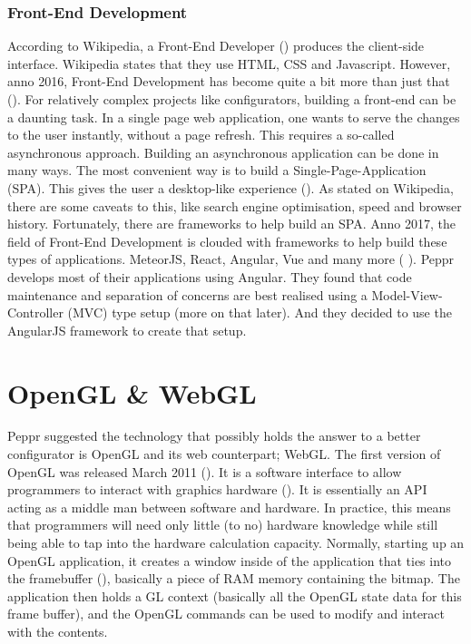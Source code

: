 \subsubsection{Front-End Development}
According to Wikipedia, a Front-End Developer (\cite{frontEndDevDefinition}) produces the client-side interface. Wikipedia states that they use HTML, CSS and Javascript. However, anno 2016, Front-End Development has become quite a bit more than just that (\cite{javascriptAnno2016}). For relatively complex projects like configurators, building a front-end can be a daunting task. In a single page web application, one wants to serve the changes to the user instantly, without a page refresh. This requires a so-called asynchronous approach. 
Building an asynchronous application can be done in many ways. The most convenient way is to build a Single-Page-Application (SPA). This gives the user a desktop-like experience (\cite{singlePageApplications}). As stated on Wikipedia, there are some caveats to this, like search engine optimisation, speed and browser history. Fortunately, there are frameworks to help build an SPA. Anno 2017, the field of Front-End Development is clouded with frameworks to help build these types of applications. MeteorJS, React, Angular, Vue and many more (\cite{frontEndJavascriptFrameworks} ).
Peppr develops most of their applications using Angular. They found that code maintenance and separation of concerns are best realised using a Model-View-Controller (MVC) type setup (more on that later). And they decided to use the AngularJS framework to create that setup.


\clearpage
\section{OpenGL \& WebGL}
Peppr suggested the technology that possibly holds the answer to a better configurator is OpenGL and its web counterpart; WebGL.
The first version of OpenGL was released March 2011 (\cite{openGLsite}). It is a software interface to allow programmers to interact with graphics hardware (\cite{openGLSpecification}). It is essentially an API acting as a middle man between software and hardware. In practice, this means that programmers will need only little (to no) hardware knowledge while still being able to tap into the hardware calculation capacity. Normally, starting up an OpenGL application, it creates a window inside of the application that ties into the framebuffer (\cite{framebuffer}), basically a piece of RAM memory containing the bitmap. The application then holds a GL context (basically all the OpenGL state data for this frame buffer), and the OpenGL commands can be used to modify and interact with the contents.

